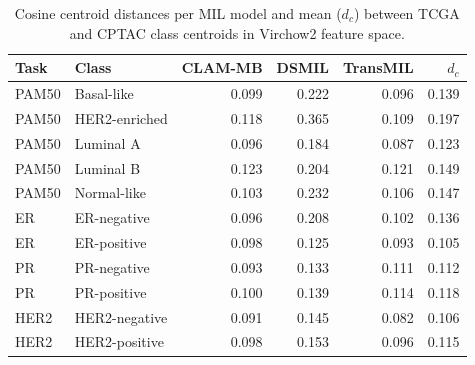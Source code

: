 \begin{table}[ht]
\centering
\caption{Cosine centroid distances per MIL model and mean ($d_c$) between TCGA and CPTAC class centroids in Virchow2 feature space.}
\label{tab:covariate_shift}
\begin{tabular}{llrrrr}
\toprule
Task & Class & CLAM-MB & DSMIL & TransMIL & $d_c$ \\
\midrule
    PAM50 & Basal-like & 0.099 & 0.222 & 0.096 & 0.139 \\
    PAM50 & HER2-enriched & 0.118 & 0.365 & 0.109 & 0.197 \\
    PAM50 & Luminal A & 0.096 & 0.184 & 0.087 & 0.123 \\
    PAM50 & Luminal B & 0.123 & 0.204 & 0.121 & 0.149 \\
    PAM50 & Normal-like & 0.103 & 0.232 & 0.106 & 0.147 \\
    ER & ER-negative & 0.096 & 0.208 & 0.102 & 0.136 \\
    ER & ER-positive & 0.098 & 0.125 & 0.093 & 0.105 \\
    PR & PR-negative & 0.093 & 0.133 & 0.111 & 0.112 \\
    PR & PR-positive & 0.100 & 0.139 & 0.114 & 0.118 \\
    HER2 & HER2-negative & 0.091 & 0.145 & 0.082 & 0.106 \\
    HER2 & HER2-positive & 0.098 & 0.153 & 0.096 & 0.115 \\
\bottomrule
\end{tabular}
\end{table}